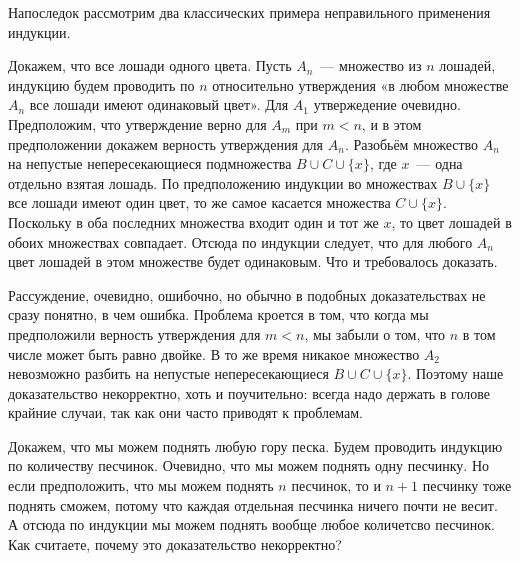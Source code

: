 Напоследок рассмотрим два классических примера неправильного применения индукции.

\begin{example}
Докажем, что все лошади одного цвета. Пусть $A_n$~— множество из $n$ лошадей, индукцию будем проводить по $n$ относительно утверждения «в любом множестве $A_n$ все лошади имеют одинаковый цвет». Для $A_1$ утвержедение очевидно. Предположим, что утверждение верно для $A_m$ при $m<n$, и в этом предположении докажем верность утверждения для $A_n$. Разобьём множество $A_n$ на непустые непересекающиеся подмножества $B\cup C \cup\{x\}$, где $x$~— одна отдельно взятая лошадь. По предположению индукции во множествах $B\cup\{x\}$ все лошади имеют один цвет, то же самое касается множества $C\cup\{x\}$. Поскольку в оба последних множества входит один и тот же $x$, то цвет лошадей в обоих множествах совпадает. Отсюда по индукции следует, что для любого $A_n$ цвет лошадей в этом множестве будет одинаковым. Что и требовалось доказать.
\end{example}

Рассуждение, очевидно, ошибочно, но обычно в подобных доказательствах не сразу понятно, в чем ошибка. Проблема кроется в том, что когда мы предположили верность утверждения для $m<n$, мы забыли о том, что $n$ в том числе может быть равно двойке. В то же время никакое множество $A_2$ невозможно разбить на непустые непересекающиеся $B\cup C\cup\{x\}$. Поэтому наше доказательство некорректно, хоть и поучительно: всегда надо держать в голове крайние случаи, так как они часто приводят к проблемам.

\begin{exercise}
Докажем, что мы можем поднять любую гору песка. Будем проводить индукцию по количеству песчинок. Очевидно, что мы можем поднять одну песчинку. Но если предположить, что мы можем поднять $n$ песчинок, то и $n+1$ песчинку тоже поднять сможем, потому что каждая отдельная песчинка ничего почти не весит. А отсюда по индукции мы можем поднять вообще любое количетсво песчинок. Как считаете, почему это доказательство некорректно?
\end{exercise}
